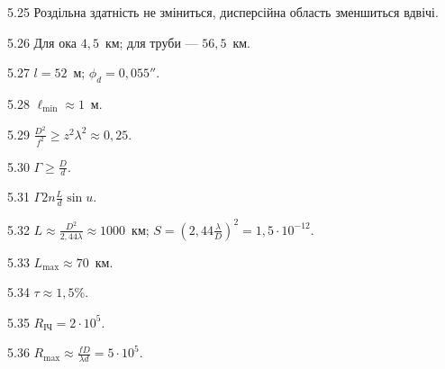 \begin{Solution}{5.{25}}
        Роздільна здатність не зміниться, дисперсійна область зменшиться вдвічі.
    
\end{Solution}
\begin{Solution}{5.{26}}
        Для ока $4,5$~км; для труби --- $56,5$~км.
    
\end{Solution}
\begin{Solution}{5.{27}}
        $l = 52$~м; $\phi_d = 0,055''$.
    
\end{Solution}
\begin{Solution}{5.{28}}
        $\ell_{\min}\approx 1$~м.
    
\end{Solution}
\begin{Solution}{5.{29}}
        $\frac{D^2}{f^2} \ge z^2\lambda^2 \approx 0,25$.
    
\end{Solution}
\begin{Solution}{5.{30}}
        $\Gamma \ge \frac{D}{d}$.
    
\end{Solution}
\begin{Solution}{5.{31}}
        $\Gamma 2n  \frac{L}{d}\sin u$.
    
\end{Solution}
\begin{Solution}{5.{32}}
        $L \approx \frac{D^2}{2,44 \lambda} \approx 1000$~км; $ S = \left( 2,44\frac{\lambda}{D} \right)^2 = 1,5\cdot10^{-12}$.
    
\end{Solution}
\begin{Solution}{5.{33}}
        $L_{\max} \approx 70$~км.
    
\end{Solution}
\begin{Solution}{5.{34}}
        $\tau \approx 1,5$\%.
    
\end{Solution}
\begin{Solution}{5.{35}}
        $R_\text{ІЧ} = 2\cdot10^5$.
    
\end{Solution}
\begin{Solution}{5.{36}}
        $R_{\max} \approx \frac{fD}{\lambda d} = 5\cdot10^5$.
    
\end{Solution}

